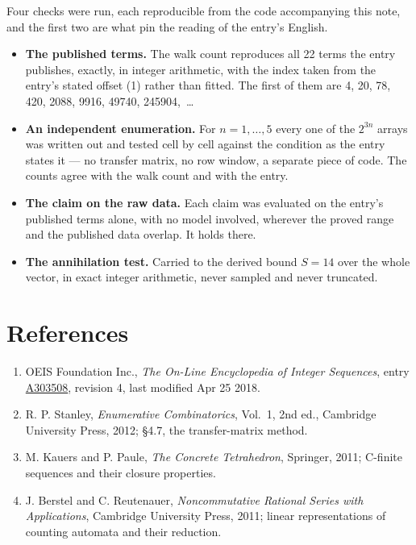 \documentclass[11pt]{article}
\theoremstyle{definition}
\begin{document}
Four checks were run, each reproducible from the code accompanying this note, and the first two are what pin the reading of the entry's English.

\begin{itemize}

\item {\bfseries The published terms.} The walk count reproduces all 22 terms the entry publishes, exactly, in integer arithmetic, with the index taken from the entry's stated offset (1) rather than fitted. The first of them are 4, 20, 78, 420, 2088, 9916, 49740, 245904,~\dots

\item {\bfseries An independent enumeration.} For $n = 1,\dots,5$ every one of the $2^{3n}$ arrays was written out and tested cell by cell against the condition as the entry states it --- no transfer matrix, no row window, a separate piece of code. The counts agree with the walk count and with the entry.

\item {\bfseries The claim on the raw data.} Each claim was evaluated on the entry's published terms alone, with no model involved, wherever the proved range and the published data overlap. It holds there.

\item {\bfseries The annihilation test.} Carried to the derived bound $S = 14$ over the whole vector, in exact integer arithmetic, never sampled and never truncated.

\end{itemize}

\section{References}

\begin{enumerate}

\item OEIS Foundation Inc., \emph{The On-Line Encyclopedia of Integer Sequences}, entry \href{https://oeis.org/A303508}{A303508}, revision 4, last modified Apr 25 2018.

\item R. P. Stanley, \emph{Enumerative Combinatorics}, Vol.~1, 2nd ed., Cambridge University Press, 2012; \S4.7, the transfer-matrix method.

\item M. Kauers and P. Paule, \emph{The Concrete Tetrahedron}, Springer, 2011; C-finite sequences and their closure properties.

\item J. Berstel and C. Reutenauer, \emph{Noncommutative Rational Series with Applications}, Cambridge University Press, 2011; linear representations of counting automata and their reduction.

\end{enumerate}
\end{document}
